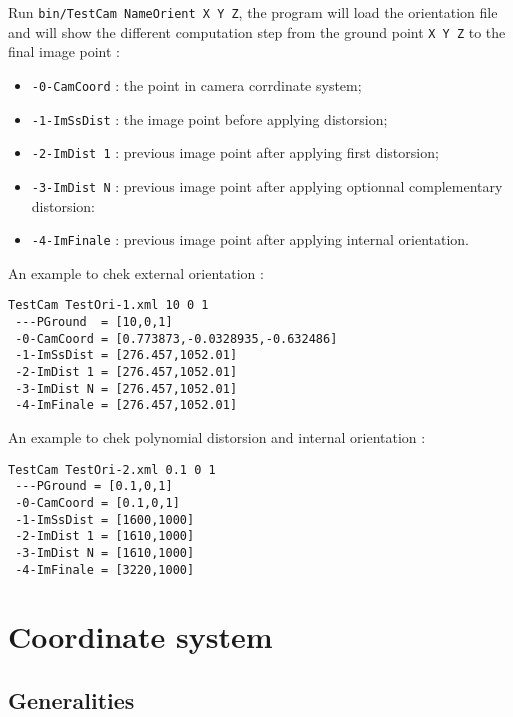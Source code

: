 Run {\tt bin/TestCam NameOrient X Y Z},  the program will load the
orientation file and will show the different computation step from
the ground point {\tt X Y Z} to the final image point :
 

\begin{itemize}
   \item  {\tt -0-CamCoord} : the point in camera corrdinate system;
   \item  {\tt -1-ImSsDist} : the image point before applying distorsion;
   \item  {\tt -2-ImDist 1} : previous image point after applying first distorsion;
   \item  {\tt -3-ImDist N} : previous image point after applying optionnal complementary distorsion:
   \item  {\tt -4-ImFinale} : previous image point after applying internal orientation.
\end{itemize}

An example  to chek external orientation :

\begin{verbatim}
TestCam TestOri-1.xml 10 0 1
 ---PGround  = [10,0,1]
 -0-CamCoord = [0.773873,-0.0328935,-0.632486]
 -1-ImSsDist = [276.457,1052.01]
 -2-ImDist 1 = [276.457,1052.01]
 -3-ImDist N = [276.457,1052.01]
 -4-ImFinale = [276.457,1052.01]
\end{verbatim}


An example  to chek polynomial distorsion and internal orientation :

\begin{verbatim}
TestCam TestOri-2.xml 0.1 0 1
 ---PGround = [0.1,0,1]
 -0-CamCoord = [0.1,0,1]
 -1-ImSsDist = [1600,1000]
 -2-ImDist 1 = [1610,1000]
 -3-ImDist N = [1610,1000]
 -4-ImFinale = [3220,1000]
\end{verbatim}



\section{Coordinate system}

\label{Coordinat:System}


\subsection{Generalities}

